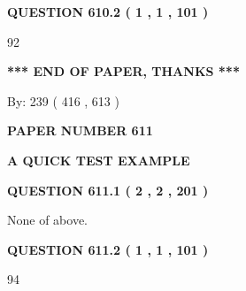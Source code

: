 \documentclass[12pt]{article}
\begin{document}
{\textbf{\Large{QUESTION
610.2 
 ( 1 , 1 , 101 )
}}}
  
  
 
 
\noindent{}

92
 
 
   
   
 \vspace{0.2in}
 
   
   
   
   
\vspace{1.0in} 
{\textbf{\large{ *** END OF PAPER, THANKS *** }}} 
   
   
\hspace{1.0in} By: 
 239 ( 416 ,  613 )
   
   
   
   
\newpage 
\setcounter{page}{ 
   611001 } 
   
   
   
   
 {\textbf{ \Large{ PAPER NUMBER  611  }}}
   
   
\vspace{0.2in}
   
   
   
   
   
   
 \vspace{0.2in}
{\LARGE {\textbf{ A QUICK TEST EXAMPLE}}}
   
   
  
\vspace{0.2in}
  
{\textbf{\Large{QUESTION
611.1 
 ( 2 , 2 , 201 )
}}}
  
  
 
 
\noindent{}
 
 
 None of above.
 
 
 
 
  
\vspace{0.2in}
  
{\textbf{\Large{QUESTION
611.2 
 ( 1 , 1 , 101 )
}}}
  
  
 
 
\noindent{}

94
 
\end{document}
